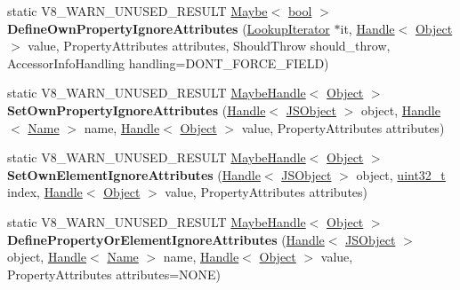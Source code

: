 \begin{DoxyCompactItemize}
static V8\+\_\+\+W\+A\+R\+N\+\_\+\+U\+N\+U\+S\+E\+D\+\_\+\+R\+E\+S\+U\+LT \mbox{\hyperlink{classv8_1_1Maybe}{Maybe}}$<$ \mbox{\hyperlink{classbool}{bool}} $>$ {\bfseries Define\+Own\+Property\+Ignore\+Attributes} (\mbox{\hyperlink{classv8_1_1internal_1_1LookupIterator}{Lookup\+Iterator}} $\ast$it, \mbox{\hyperlink{classv8_1_1internal_1_1Handle}{Handle}}$<$ \mbox{\hyperlink{classv8_1_1internal_1_1Object}{Object}} $>$ value, Property\+Attributes attributes, Should\+Throw should\+\_\+throw, Accessor\+Info\+Handling handling=D\+O\+N\+T\+\_\+\+F\+O\+R\+C\+E\+\_\+\+F\+I\+E\+LD)
\item 
\mbox{\label{classv8_1_1internal_1_1JSObject_a9e0a607bf7dc42d4dc0461b1b20c6359}} 
static V8\+\_\+\+W\+A\+R\+N\+\_\+\+U\+N\+U\+S\+E\+D\+\_\+\+R\+E\+S\+U\+LT \mbox{\hyperlink{classv8_1_1internal_1_1MaybeHandle}{Maybe\+Handle}}$<$ \mbox{\hyperlink{classv8_1_1internal_1_1Object}{Object}} $>$ {\bfseries Set\+Own\+Property\+Ignore\+Attributes} (\mbox{\hyperlink{classv8_1_1internal_1_1Handle}{Handle}}$<$ \mbox{\hyperlink{classv8_1_1internal_1_1JSObject}{J\+S\+Object}} $>$ object, \mbox{\hyperlink{classv8_1_1internal_1_1Handle}{Handle}}$<$ \mbox{\hyperlink{classv8_1_1internal_1_1Name}{Name}} $>$ name, \mbox{\hyperlink{classv8_1_1internal_1_1Handle}{Handle}}$<$ \mbox{\hyperlink{classv8_1_1internal_1_1Object}{Object}} $>$ value, Property\+Attributes attributes)
\item 
\mbox{\label{classv8_1_1internal_1_1JSObject_aeb24f48d160746218bd2298b8485890c}} 
static V8\+\_\+\+W\+A\+R\+N\+\_\+\+U\+N\+U\+S\+E\+D\+\_\+\+R\+E\+S\+U\+LT \mbox{\hyperlink{classv8_1_1internal_1_1MaybeHandle}{Maybe\+Handle}}$<$ \mbox{\hyperlink{classv8_1_1internal_1_1Object}{Object}} $>$ {\bfseries Set\+Own\+Element\+Ignore\+Attributes} (\mbox{\hyperlink{classv8_1_1internal_1_1Handle}{Handle}}$<$ \mbox{\hyperlink{classv8_1_1internal_1_1JSObject}{J\+S\+Object}} $>$ object, \mbox{\hyperlink{classuint32__t}{uint32\+\_\+t}} index, \mbox{\hyperlink{classv8_1_1internal_1_1Handle}{Handle}}$<$ \mbox{\hyperlink{classv8_1_1internal_1_1Object}{Object}} $>$ value, Property\+Attributes attributes)
\item 
\mbox{\label{classv8_1_1internal_1_1JSObject_a63981809a6caec14ae40a4387973a63c}} 
static V8\+\_\+\+W\+A\+R\+N\+\_\+\+U\+N\+U\+S\+E\+D\+\_\+\+R\+E\+S\+U\+LT \mbox{\hyperlink{classv8_1_1internal_1_1MaybeHandle}{Maybe\+Handle}}$<$ \mbox{\hyperlink{classv8_1_1internal_1_1Object}{Object}} $>$ {\bfseries Define\+Property\+Or\+Element\+Ignore\+Attributes} (\mbox{\hyperlink{classv8_1_1internal_1_1Handle}{Handle}}$<$ \mbox{\hyperlink{classv8_1_1internal_1_1JSObject}{J\+S\+Object}} $>$ object, \mbox{\hyperlink{classv8_1_1internal_1_1Handle}{Handle}}$<$ \mbox{\hyperlink{classv8_1_1internal_1_1Name}{Name}} $>$ name, \mbox{\hyperlink{classv8_1_1internal_1_1Handle}{Handle}}$<$ \mbox{\hyperlink{classv8_1_1internal_1_1Object}{Object}} $>$ value, Property\+Attributes attributes=N\+O\+NE)

\end{DoxyCompactItemize}
